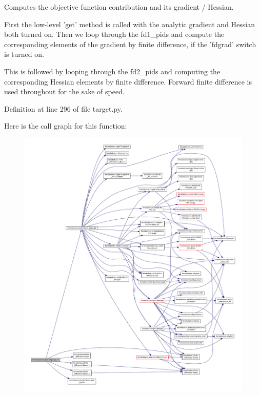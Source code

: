 Computes the objective function contribution and its gradient / Hessian. 

First the low-\/level 'get' method is called with the analytic gradient and Hessian both turned on. Then we loop through the fd1\-\_\-pids and compute the corresponding elements of the gradient by finite difference, if the 'fdgrad' switch is turned on.

This is followed by looping through the fd2\-\_\-pids and computing the corresponding Hessian elements by finite difference. Forward finite difference is used throughout for the sake of speed. 

Definition at line 296 of file target.\-py.



Here is the call graph for this function\-:
\nopagebreak
\begin{figure}[H]
\begin{center}
\leavevmode
\includegraphics[width=350pt]{classforcebalance_1_1target_1_1Target_a1d2ee27fe86a09769c1816af23b09adb_cgraph}
\end{center}
\end{figure}


